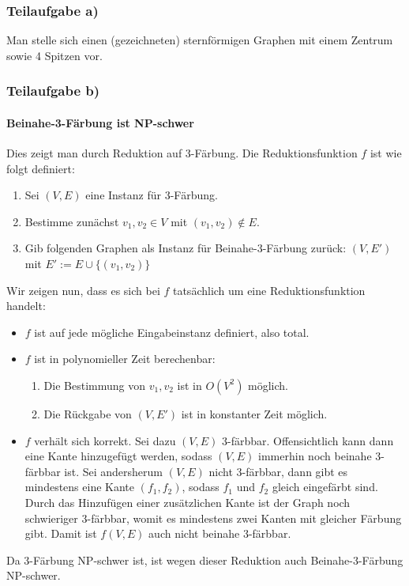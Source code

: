 
\subsubsection{Teilaufgabe a)}

Man stelle sich einen (gezeichneten) sternförmigen Graphen mit einem Zentrum
sowie 4 Spitzen vor.

\subsubsection{Teilaufgabe b)}

\paragraph{Beinahe-3-Färbung ist NP-schwer}
Dies zeigt man durch Reduktion auf 3-Färbung. Die Reduktionsfunktion $f$ ist wie
folgt definiert:
\begin{enumerate}
	\item
		Sei $(V,E)$ eine Instanz für 3-Färbung.
	\item
		Bestimme zunächst $v_1,v_2 \in V$ mit $(v_1,v_2) \notin E$.
	\item
		Gib folgenden Graphen als Instanz für Beinahe-3-Färbung zurück:
		$(V,E')$ mit $E' := E \cup \{(v_1,v_2)\}$
\end{enumerate}

Wir zeigen nun, dass es sich bei $f$ tatsächlich um eine Reduktionsfunktion
handelt:

\begin{itemize}
	\item
		$f$ ist auf jede mögliche Eingabeinstanz definiert, also total.
	\item
		$f$ ist in polynomieller Zeit berechenbar:
		\begin{enumerate}
			\item
				Die Bestimmung von $v_1,v_2$ ist in
				$O(V^2)$ möglich.
			\item
				Die Rückgabe von $(V,E')$ ist in konstanter Zeit
				möglich.
		\end{enumerate}
	\item
		$f$ verhält sich korrekt. Sei dazu $(V,E)$ 3-färbbar.
		Offensichtlich kann dann eine Kante hinzugefügt werden, sodass
		$(V,E)$ immerhin noch beinahe 3-färbbar ist. Sei andersherum
		$(V,E)$ nicht 3-färbbar, dann gibt es mindestens eine Kante
		$(f_1,f_2)$, sodass $f_1$ und $f_2$ gleich eingefärbt sind.
		Durch das Hinzufügen einer zusätzlichen Kante ist der Graph noch
		schwieriger 3-färbbar, womit es mindestens zwei Kanten mit
		gleicher Färbung gibt. Damit ist $f(V,E)$ auch nicht beinahe
		3-färbbar.
\end{itemize}
Da 3-Färbung NP-schwer ist, ist wegen dieser Reduktion auch Beinahe-3-Färbung
NP-schwer.
\par

